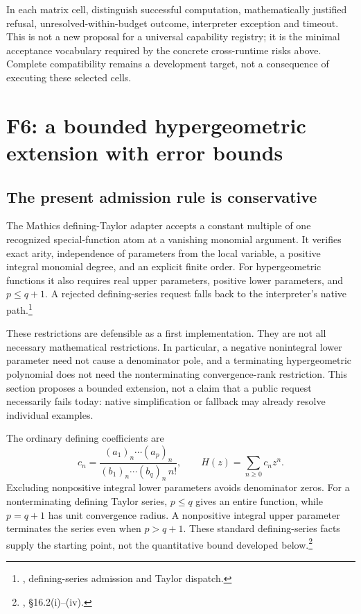 \documentclass[11pt,letterpaper]{article}
\newcommand{\code}[1]{\texttt{\detokenize{#1}}}
\newcommand{\src}[2]{\footnote{\cite{#1}, #2.}}
\begin{document}
In each matrix cell, distinguish successful computation, mathematically justified refusal, unresolved-within-budget outcome, interpreter exception and timeout. This is not a new proposal for a universal capability registry; it is the minimal acceptance vocabulary required by the concrete cross-runtime risks above. Complete compatibility remains a development target, not a consequence of executing these selected cells.

\section{F6: a bounded hypergeometric extension with error bounds}
\subsection{The present admission rule is conservative}

The Mathics defining-Taylor adapter accepts a constant multiple of one recognized special-function atom at a vanishing monomial argument. It verifies exact arity, independence of parameters from the local variable, a positive integral monomial degree, and an explicit finite order. For hypergeometric functions it also requires real upper parameters, positive lower parameters, and $p\le q+1$. A rejected defining-series request falls back to the interpreter's native \code{Series} path.\src{mtaylor}{defining-series admission and Taylor dispatch}

These restrictions are defensible as a first implementation. They are not all necessary mathematical restrictions. In particular, a negative nonintegral lower parameter need not cause a denominator pole, and a terminating hypergeometric polynomial does not need the nonterminating convergence-rank restriction. This section proposes a bounded extension, not a claim that a public request necessarily fails today: native simplification or fallback may already resolve individual examples.

The ordinary defining coefficients are
\begin{equation}\label{eq:hgcoeff}
 c_n=\frac{(a_1)_n\cdots(a_p)_n}{(b_1)_n\cdots(b_q)_n\,n!},
 \qquad H(z)=\sum_{n\ge0}c_nz^n.
\end{equation}
Excluding nonpositive integral lower parameters avoids denominator zeros. For a nonterminating defining Taylor series, $p\le q$ gives an entire function, while $p=q+1$ has unit convergence radius. A nonpositive integral upper parameter terminates the series even when $p>q+1$. These standard defining-series facts supply the starting point, not the quantitative bound developed below.\src{dlmf-hg}{\S16.2(i)--(iv)}
\end{document}
